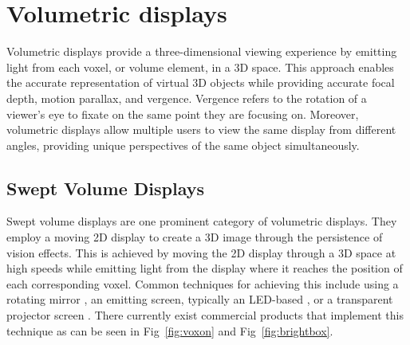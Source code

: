 \section{Volumetric displays}

Volumetric displays \cite{1492264} provide a three-dimensional viewing experience by emitting light from each voxel, or volume element, in a 3D space. This approach enables the accurate representation of virtual 3D objects while providing accurate focal depth, motion parallax, and vergence. Vergence refers to the rotation of a viewer's eye to fixate on the same point they are focusing on. Moreover, volumetric displays allow multiple users to view the same display from different angles, providing unique perspectives of the same object simultaneously.

\subsection{Swept Volume Displays}
Swept volume displays are one prominent category of volumetric displays. They employ a moving 2D display to create a 3D image through the persistence of vision effects. This is achieved by moving the 2D display through a 3D space at high speeds while emitting light from the display where it reaches the position of each corresponding voxel. Common techniques for achieving this include using a rotating mirror \cite{10.1117/12.480930}, an emitting screen, typically an LED-based \cite{Gately:11}, or a transparent projector screen \cite{keane_volumetric_2016}. There currently exist commercial products that implement this technique as can be seen in Fig~\ref{fig:voxon} and Fig~\ref{fig:brightbox}.

